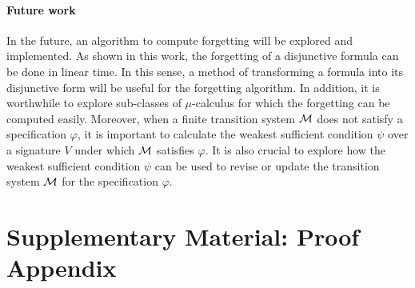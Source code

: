 \documentclass[runningheads]{llncs}
\begin{document}
\paragraph{Future work}
In the future, an algorithm to compute forgetting will be explored and implemented. As shown in this work, the forgetting of a disjunctive formula can be done in linear time. In this sense, a method of transforming a formula into its disjunctive form will be useful for the forgetting algorithm.
In addition, it is worthwhile to explore sub-classes of $\mu$-calculus for which the forgetting can be computed easily.
Moreover, when a finite transition system ${\cal M}$ does not satisfy a specification $\varphi$,
it is important to calculate the weakest sufficient condition $\psi$ over a signature $V$ under which ${\cal M}$ satisfies $\varphi$. %
It is also crucial to explore how the weakest sufficient condition $\psi$
can be used to revise or update the transition system ${\cal M}$ for the specification $\varphi$.


\clearpage




\clearpage
\appendix
\section{Supplementary Material: Proof Appendix}
\end{document}
